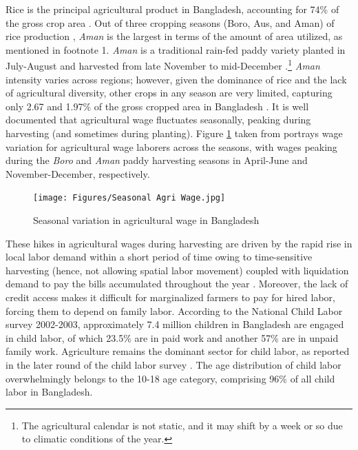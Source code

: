 \documentclass[12pt,letterpaper]{article}
\newcommand{\0}{\ensuremath{\mbox{\boldmath $0$}}}
\begin{document}
Rice is the principal agricultural product in Bangladesh, accounting for 74\% of the gross crop area \citep{tisdell2019agricultural}. Out of three cropping seasons (Boro, Aus, and Aman) of rice production \citep{laborte2017riceatlas}, \textit{Aman} is the largest in terms of the amount of area utilized, as mentioned in footnote 1. \textit{Aman} is a traditional rain-fed paddy variety planted in July-August and harvested from late November to mid-December \citep{shelley2016rice}.\footnote{The agricultural calendar is not static, and it may shift by a week or so due to climatic conditions of the year. } \textit{Aman} intensity varies across regions; however, given the dominance of rice and the lack of agricultural diversity, other crops in any season are very limited, capturing only 2.67 and 1.97\% of the gross cropped area in Bangladesh \citep{tisdell2019agricultural}. It is well documented that agricultural wage fluctuates seasonally, peaking during harvesting (and sometimes during planting). Figure \ref{wage} taken from \citet{rahman1988labour} portrays wage variation for agricultural wage laborers across the seasons, with wages peaking during the \textit{Boro} and \textit{Aman} paddy harvesting seasons in April-June and November-December, respectively.

\begin{figure}[h!]
\centering
\texttt{[image: Figures/Seasonal Agri Wage.jpg]}\\
\caption{Seasonal variation in agricultural wage in Bangladesh}
\label{wage}
\end{figure}

These hikes in agricultural wages during harvesting are driven by the rapid rise in local labor demand within a short period of time owing to time-sensitive harvesting (hence, not allowing spatial labor movement) coupled with liquidation demand to pay the bills accumulated throughout the year \citep{burke2019sell}. Moreover, the lack of credit access makes it difficult for marginalized farmers to pay for hired labor, forcing them to depend on family labor. According to the \cite{bbs2003report} National Child Labor survey 2002-2003, approximately 7.4 million children in Bangladesh are engaged in child labor, of which 23.5\% are in paid work and another 57\% are in unpaid family work. Agriculture remains the dominant sector for child labor, as reported in the later round of the child labor survey \cite{bbs2013report}. The age distribution of child labor overwhelmingly belongs to the 10-18 age category, comprising 96\% of all child labor in Bangladesh.
\end{document}
